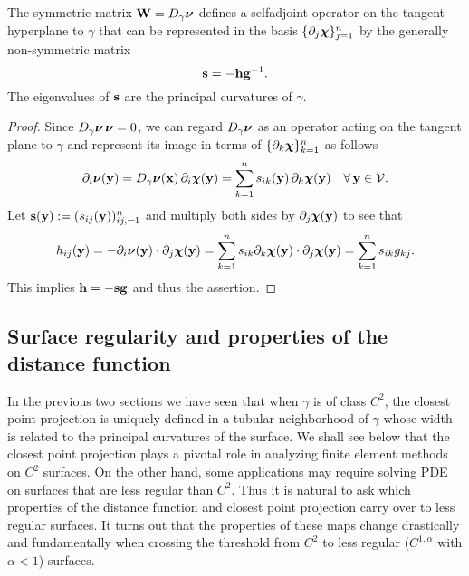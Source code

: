 \begin{lemma}\label{L:second-form}
The symmetric matrix ${\bf W}=D_\gamma{\boldsymbol \nu}$ defines a selfadjoint operator on
the tangent hyperplane to $\gamma$ that can be represented in the basis
$\{\partial_j{\boldsymbol \chi}\}_{j=1}^n$ by the generally non-symmetric matrix
%
\[
{\bf s} = -{\bf h} {\bf g}^{-1}.
\]
%
The eigenvalues of ${\bf s}$ are the principal curvatures of $\gamma$.
\end{lemma}  
%
\begin{proof}
Since $D_\gamma{\boldsymbol \nu} \, {\boldsymbol \nu} = 0$, we can regard $D_\gamma{\boldsymbol \nu}$ as an operator acting on the
tangent plane to $\gamma$ and represent its image in terms
of $\{\partial_k{\boldsymbol \chi}\}_{k=1}^n$ as follows
%
\[
\partial_i{\boldsymbol \nu} ({\bf y}) =
D_\gamma{\boldsymbol \nu}({\bf x}) \, \partial_i{\boldsymbol \chi}({\bf y})
= \sum_{k=1}^n s_{ik}({\bf y}) \, \partial_k{\boldsymbol \chi}({\bf y})
\quad\forall \, {\bf y}\in\mathcal{V}.
\]
%
Let ${\bf s}({\bf y}) := (s_{ij}({\bf y}))_{ij, = 1}^n$ and multiply both sides by
$\partial_j{\boldsymbol \chi}({\bf y})$ to see that
%
\[
h_{ij}({\bf y}) = - \partial_i{\boldsymbol \nu}({\bf y}) \cdot \partial_j{\boldsymbol \chi}({\bf y})
= \sum_{k=1}^n s_{ik} \partial_k{\boldsymbol \chi}({\bf y})\cdot\partial_j{\boldsymbol \chi}({\bf y})
= \sum_{k=1}^n s_{ik} g_{kj}.
\]
%
This implies ${\bf h}=-{\bf s}{\bf g}$ and thus the assertion.
\end{proof}

\subsection{Surface regularity and properties of the distance function} \label{S:d_for_C1}

In the previous two sections we have seen that when $\gamma$ is of class $C^2$, the closest point projection is uniquely defined in a tubular neighborhood of $\gamma$ whose width is related to the principal curvatures of the surface.  We shall see below that the closest point projection plays a pivotal role in analyzing finite element methods on $C^2$ surfaces.  On the other hand, some applications may require solving PDE on surfaces that are less regular than $C^2$.  Thus it is natural to ask which properties of the distance function and closest point projection carry over to less regular surfaces.  It turns out that the properties of these maps change drastically and fundamentally when crossing the threshold from $C^2$ to less regular ($C^{1,\alpha}$ with $\alpha<1$) surfaces.  

